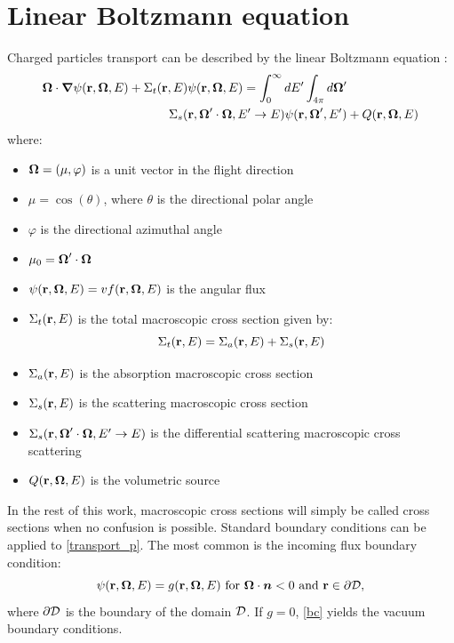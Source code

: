 \section{Linear Boltzmann equation}
Charged particles transport can be described by the linear Boltzmann equation 
\cite{cepxs,galerkin_morel,morel_81}:
\begin{equation}
  \begin{split}
    \bo\cdot \bn \psi(\br,\bo,E) + \Sigma_t(\br,E)\psi(\br,\bo,E) = 
    \int_0^{\infty}dE'\int_{4\pi}d\bo'&  \\
     \Sigma_s(\br,\bo'\cdot\bo,E'\rightarrow E)
     \psi(\br,\bo',E')&+Q(\br,\bo,E)
  \end{split}
\label{transport_p}
\end{equation}
where:
\begin{itemize}
\item $\boldsymbol{\Omega} = (\mu,\varphi)$ is a unit vector in the flight direction
\item $\mu = \cos(\theta)$, where $\theta$ is the directional polar angle
\item $\varphi$ is the directional azimuthal angle
\item $\mu_0 = \boldsymbol{\Omega}'\cdot \boldsymbol{\Omega}$ 
\item $\psi(\mathbf{r},\boldsymbol{\Omega},E) = vf(\mathbf{r},\boldsymbol{\Omega},E)$ is the angular flux
\item $\Sigma_t(\mathbf{r},E)$ is the total macroscopic cross section given by:
\begin{equation}
\Sigma_t(\mathbf{r},E) = \Sigma_a(\mathbf{r},E)+\Sigma_s(\mathbf{r},E)
\end{equation}
\item $\Sigma_a(\mathbf{r},E)$ is the absorption macroscopic cross section
\item $\Sigma_s(\mathbf{r},E)$ is the scattering macroscopic cross section
\item $\Sigma_s(\mathbf{r},\boldsymbol{\Omega}'\cdot \boldsymbol{\Omega}, E'\rightarrow E)$ is the differential
scattering macroscopic cross scattering
\item $Q(\mathbf{r},\boldsymbol{\Omega},E)$ is the volumetric source
\end{itemize}
In the rest of this work, macroscopic cross sections will simply be called cross
sections when no confusion is possible. Standard boundary conditions can be
applied to \cref{transport_p}. The most common is the incoming flux boundary
condition:
\begin{equation}
  \psi (\br,\bo,E) = g(\br,\bo,E) \textrm{ for }\bo \cdot \bs{n} <0 \textrm{ and }
\br \in \partial \mc{D},
\label{bc}
\end{equation}
where $\partial \mathcal{D}$ is the boundary of the domain $\mathcal{D}$. If $g=0$, 
\cref{bc} yields the vacuum boundary conditions.

